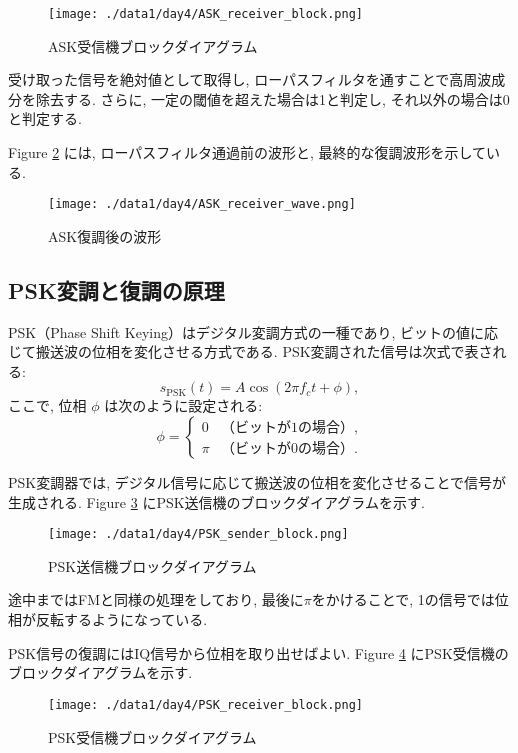 \documentclass[a4paper, twocolumn]{article} %
\begin{document}
\begin{figure}[H]
    \centering
    \texttt{[image: ./data1/day4/ASK\_receiver\_block.png]}
    \caption{ASK受信機ブロックダイアグラム}
    \label{fig:ask_receiver_block}
\end{figure}

受け取った信号を絶対値として取得し, ローパスフィルタを通すことで高周波成分を除去する. さらに, 一定の閾値を超えた場合は1と判定し, それ以外の場合は0と判定する.

Figure \ref{fig:ask_receiver_wave} には, ローパスフィルタ通過前の波形と, 最終的な復調波形を示している.

\begin{figure}[H]
    \centering
    \texttt{[image: ./data1/day4/ASK\_receiver\_wave.png]}
    \caption{ASK復調後の波形}
    \label{fig:ask_receiver_wave}
\end{figure}

\subsection{PSK変調と復調の原理}
PSK（Phase Shift Keying）はデジタル変調方式の一種であり, ビットの値に応じて搬送波の位相を変化させる方式である. PSK変調された信号は次式で表される:
\[
s_{\text{PSK}}(t) = A \cos(2\pi f_c t + \phi),
\]
ここで, 位相 \(\phi\) は次のように設定される:
\[
\phi =
\begin{cases}
0 & \text{（ビットが1の場合）}, \\
\pi & \text{（ビットが0の場合）}.
\end{cases}
\]

PSK変調器では, デジタル信号に応じて搬送波の位相を変化させることで信号が生成される. Figure \ref{fig:psk_sender_block} にPSK送信機のブロックダイアグラムを示す.

\begin{figure}[H]
    \centering
    \texttt{[image: ./data1/day4/PSK\_sender\_block.png]}
    \caption{PSK送信機ブロックダイアグラム}
    \label{fig:psk_sender_block}
\end{figure}

途中まではFMと同様の処理をしており, 最後に\(\pi\)をかけることで, 1の信号では位相が反転するようになっている.

PSK信号の復調にはIQ信号から位相を取り出せばよい. Figure \ref{fig:psk_receiver_block} にPSK受信機のブロックダイアグラムを示す.

\begin{figure}[H]
    \centering
    \texttt{[image: ./data1/day4/PSK\_receiver\_block.png]}
    \caption{PSK受信機ブロックダイアグラム}
    \label{fig:psk_receiver_block}
\end{figure}
\end{document}
